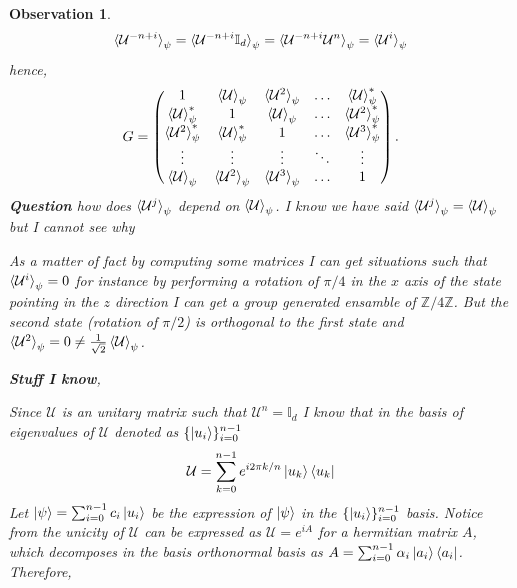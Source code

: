 \documentclass[12pt,letterpaper]{article}
\newtheorem{observation}{Observation}
\begin{document}
\begin{multicols}{2}
\begin{observation}
\begin{align}
\braket{\mathcal{U}^{-n+i}}_{\psi}=\braket{\mathcal{U}^{-n+i}\mathbb{I}_d}_{\psi}=\braket{\mathcal{U}^{-n+i}\mathcal{U}^{n}}_{\psi}=\braket{\mathcal{U}^{i}}_{\psi}
\end{align}
hence,
\begin{align}
G=\begin{pmatrix}
 1 & \braket{\mathcal{U}}_{\psi} & \braket{\mathcal{U}^{2}}_{\psi} & \hdots &  \braket{\mathcal{U}}_{\psi}^* \\
  \braket{\mathcal{U}}_{\psi}^* & 1 & \braket{\mathcal{U}}_{\psi} & \hdots &  \braket{\mathcal{U}^{2}}_{\psi}^* \\
    \braket{\mathcal{U}^{2}}_{\psi}^* &  \braket{\mathcal{U}}_{\psi}^*  & 1 & \hdots &  \braket{\mathcal{U}^{3}}_{\psi}^* \\
   \vdots & \vdots & \vdots & \ddots & \vdots \\
  \braket{\mathcal{U}}_{\psi} & \braket{\mathcal{U}^{2}}_{\psi}  & \braket{\mathcal{U}^{3}}_{\psi}  & \hdots &  1 
\end{pmatrix}.
\end{align}
\textbf{Question} how does $\braket{\mathcal{U}^{j}}_{\psi}$ depend on $\braket{\mathcal{U}}_{\psi}$. I know we have said $\braket{\mathcal{U}^{j}}_{\psi} =\braket{\mathcal{U}}_{\psi}$ but I cannot see why \par
As a matter of fact by computing some matrices I can get situations such that $\braket{\mathcal{U}^{i}}_{\psi}=0$ for instance by performing a rotation of $\pi/4$ in the $x$ axis of the state pointing in the $z$ direction I can get a group generated ensamble of $\mathbb{Z}/4\mathbb{Z}$. But the second state (rotation of $\pi/2$) is orthogonal to the first state and $\braket{\mathcal{U}^2}_{\psi}=0\neq \frac{1}{\sqrt{2}}\braket{\mathcal{U}}_{\psi}$. \par
\textbf{Stuff I know},\par 
Since $\mathcal{U}$ is an unitary matrix such that $\mathcal{U}^n=\mathbb{I}_d$ I know that in the basis of eigenvalues of $\mathcal{U}$ denoted as $\{\ket{u_i}\}_{i=0}^{n-1}$
\begin{align}
\mathcal{U}=\sum_{k=0}^{n-1}e^{i2\pi k/n}\ket{u_k}\bra{u_k}
\end{align}
Let $\ket{\psi}=\sum_{i=0}^{n-1}c_i\ket{u_i}$ be the expression of $\ket{\psi}$ in the $\{\ket{u_i}\}_{i=0}^{n-1}$ basis. Notice from the unicity of $\mathcal{U}$ can be expressed as $\mathcal{U}=e^{iA}$ for a hermitian matrix $A$, which decomposes in the basis orthonormal basis as $A=\sum_{i=0}^{n-1}\alpha_i\ket{a_i}\bra{a_i}$. Therefore,

\end{observation}
\end{multicols}
\end{document}
